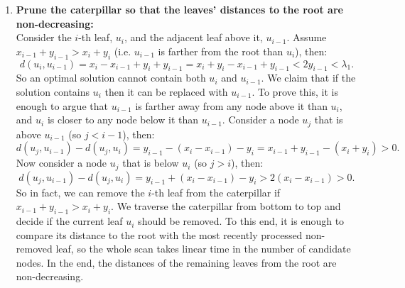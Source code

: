 \documentclass[11pt,a4paper]{article}
\theoremstyle{definition}
\theoremstyle{remark}
\begin{document}
\begin{enumerate}
\item\label{making distances from the root monotone}
\textbf{Prune the caterpillar so that the leaves' distances to the root are non-decreasing:}\\
Consider the $i$-th leaf, $u_i$, and the adjacent leaf above it, $u_{i-1}$. Assume $x_{i-1}+y_{i-1} > x_i+y_i$
(i.e. $u_{i-1}$ is farther from the root than $u_i$), then:
$$ d(u_{i},u_{i-1}) = x_i-x_{i-1}+y_i+y_{i-1} = x_{i} + y_{i} - x_{i-1} + y_{i-1} < 2y_{i-1} < \lambda_1.$$
So an optimal solution cannot contain both $u_{i}$ and $u_{i-1}$. We claim that if the solution contains
$u_{i}$ then it can be replaced with $u_{i-1}$. To prove this, it is enough to argue that
$u_{i-1}$ is farther away from any node above it than $u_i$, and $u_i$ is closer to any node below it than $u_{i-1}$.
Consider a node $u_{j}$ that is above $u_{i-1}$ (so $j<i-1$), then:
$$d(u_j,u_{i-1}) - d(u_j,u_{i}) = y_{i-1}-(x_i-x_{i-1})-y_i = x_{i-1}+y_{i-1}-(x_i+y_i) > 0.$$
Now consider a node $u_{j}$ that is below $u_{i}$ (so $j>i$), then:
$$d(u_j,u_{i-1}) - d(u_j,u_{i}) = y_{i-1}+(x_i-x_{i-1})-y_i > 2(x_i-x_{i-1}) > 0.$$
So in fact, we can remove the $i$-th leaf from the caterpillar if $x_{i-1}+y_{i-1} > x_i+y_i$. 
We traverse the caterpillar from bottom to top and decide if the current leaf $u_{i}$ should be removed.
To this end, it is enough to compare its distance to the root with the most recently processed non-removed leaf,
so the whole scan takes linear time in the number of candidate nodes. In the end, the distances of the
remaining leaves from the root are non-decreasing.


\end{enumerate}
\end{document}
